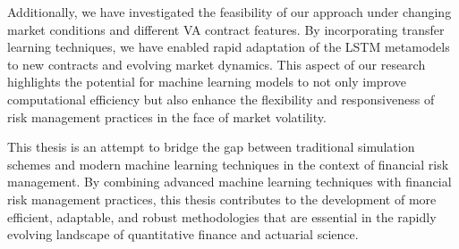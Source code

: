Additionally, we have investigated the feasibility of our approach under changing market conditions and different VA contract features. 
By incorporating transfer learning techniques, we have enabled rapid adaptation of the LSTM metamodels to new contracts and evolving market dynamics. 
This aspect of our research highlights the potential for machine learning models to not only improve computational efficiency but also enhance the flexibility and responsiveness of risk management practices in the face of market volatility.

This thesis is an attempt to bridge the gap between traditional simulation schemes and modern machine learning techniques in the context of financial risk management.
By combining advanced machine learning techniques with financial risk management practices, this thesis contributes to the development of more efficient, adaptable, and robust methodologies that are essential in the rapidly evolving landscape of quantitative finance and actuarial science.
